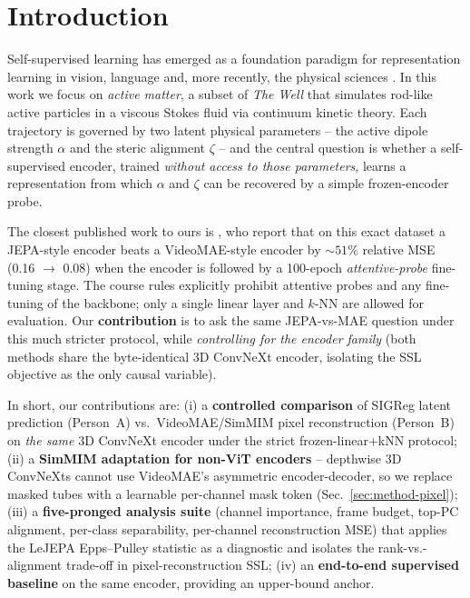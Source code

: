 \documentclass{article}
\begin{document}
\section{Introduction}
\label{sec:intro}

Self-supervised learning has emerged as a foundation paradigm for representation
learning in vision, language and, more recently, the physical sciences
\citep{qu2026spatiotemporal,balestriero2023cookbook}. In this work we focus on
\emph{active matter}, a subset of \emph{The Well} \citep{ohana2025well} that
simulates rod-like active particles in a viscous Stokes fluid via continuum
kinetic theory. Each trajectory is governed by two latent physical parameters
-- the active dipole strength $\alpha$ and the steric alignment $\zeta$ -- and
the central question is whether a self-supervised encoder, trained
\emph{without access to those parameters}, learns a representation from which
$\alpha$ and $\zeta$ can be recovered by a simple frozen-encoder probe.

The closest published work to ours is \citet{qu2026spatiotemporal}, who report
that on this exact dataset a JEPA-style encoder beats a VideoMAE-style encoder
by ${\sim}51\%$ relative MSE (0.16 $\to$ 0.08) when the encoder is followed by
a 100-epoch \emph{attentive-probe} fine-tuning stage. The course rules
explicitly prohibit attentive probes and any fine-tuning of the backbone; only
a single linear layer and $k$-NN are allowed for evaluation. Our
\textbf{contribution} is to ask the same JEPA-vs-MAE question under this much
stricter protocol, while \emph{controlling for the encoder family} (both
methods share the byte-identical 3D ConvNeXt encoder, isolating the SSL
objective as the only causal variable).

In short, our contributions are: (i) a \textbf{controlled comparison} of
SIGReg latent prediction (Person~A) vs.\ VideoMAE/SimMIM pixel reconstruction
(Person~B) on \emph{the same} 3D ConvNeXt encoder under the strict
frozen-linear+kNN protocol; (ii) a \textbf{SimMIM adaptation for non-ViT
encoders} -- depthwise 3D ConvNeXts cannot use VideoMAE's asymmetric
encoder-decoder, so we replace masked tubes with a learnable per-channel
mask token (Sec.~\ref{sec:method-pixel}); (iii) a \textbf{five-pronged
analysis suite} (channel importance, frame budget, top-PC alignment,
per-class separability, per-channel reconstruction MSE) that applies the
LeJEPA Epps--Pulley statistic \citep{balestriero2026lejepa} as a diagnostic
and isolates the rank-vs.-alignment trade-off in pixel-reconstruction SSL;
(iv) an \textbf{end-to-end supervised baseline} on the same encoder,
providing an upper-bound anchor.
\end{document}

